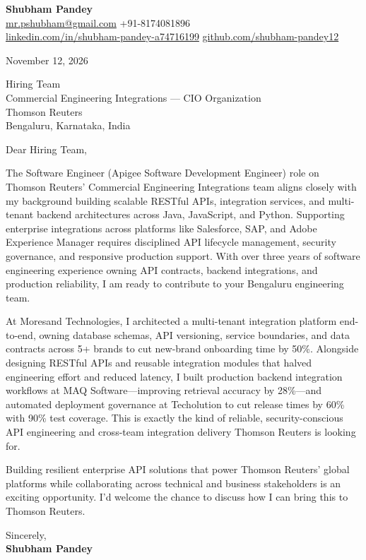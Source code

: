 \documentclass[a4paper,11pt]{article}
\begin{document}
\textbf{\Large Shubham Pandey}\\
\href{mailto:mr.pshubham@gmail.com}{mr.pshubham@gmail.com} \quad +91-8174081896\\
\href{https://www.linkedin.com/in/shubham-pandey-a74716199/}{linkedin.com/in/shubham-pandey-a74716199} \quad
\href{https://github.com/shubham-pandey12}{github.com/shubham-pandey12}

\vspace{1em}
November 12, 2026

\vspace{1em}
Hiring Team\\
Commercial Engineering Integrations --- CIO Organization\\
Thomson Reuters\\
Bengaluru, Karnataka, India

\vspace{1em}
Dear Hiring Team,

The Software Engineer (Apigee Software Development Engineer) role on Thomson Reuters' Commercial Engineering Integrations team aligns closely with my background building scalable RESTful APIs, integration services, and multi-tenant backend architectures across Java, JavaScript, and Python. Supporting enterprise integrations across platforms like Salesforce, SAP, and Adobe Experience Manager requires disciplined API lifecycle management, security governance, and responsive production support. With over three years of software engineering experience owning API contracts, backend integrations, and production reliability, I am ready to contribute to your Bengaluru engineering team.

At Moresand Technologies, I architected a multi-tenant integration platform end-to-end, owning database schemas, API versioning, service boundaries, and data contracts across 5+ brands to cut new-brand onboarding time by 50\%. Alongside designing RESTful APIs and reusable integration modules that halved engineering effort and reduced latency, I built production backend integration workflows at MAQ Software---improving retrieval accuracy by 28\%---and automated deployment governance at Techolution to cut release times by 60\% with 90\% test coverage. This is exactly the kind of reliable, security-conscious API engineering and cross-team integration delivery Thomson Reuters is looking for.

Building resilient enterprise API solutions that power Thomson Reuters' global platforms while collaborating across technical and business stakeholders is an exciting opportunity. I'd welcome the chance to discuss how I can bring this to Thomson Reuters.

\vspace{1em}
Sincerely,\\[0.5em]
\textbf{Shubham Pandey}
\end{document}

